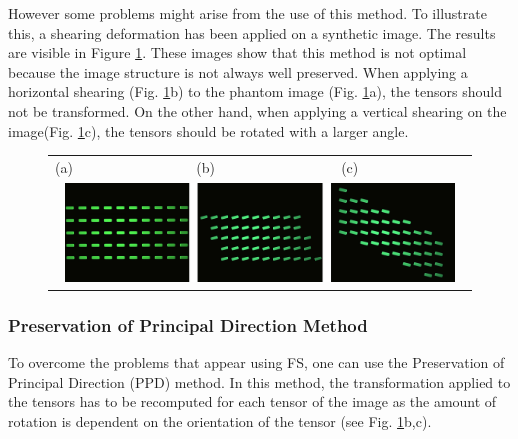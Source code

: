 \documentclass{InsightArticle}
\begin{document}
However some problems might arise from the use of this method. To illustrate this, a shearing deformation has been applied on a synthetic image. The results are visible in  Figure \ref{fig:FSTransformation}. These images show that this method is not optimal because the image structure is not always well preserved. When applying a horizontal shearing (Fig. \ref{fig:FSTransformation}b) to the phantom image (Fig. \ref{fig:FSTransformation}a), the tensors should not be transformed. On the other hand, when applying a vertical shearing on the image(Fig. \ref{fig:FSTransformation}c), the tensors should be rotated with a larger angle.


\begin{figure}
\begin{tabularx}{\textwidth}{CCC}
(a) & (b) & (c) \\
\\
\end{tabularx}
\label{fig:FSTransformation}
\end{figure}


\subsubsection{Preservation of Principal Direction Method}
To overcome the problems that appear using FS, one can use the Preservation of Principal Direction (PPD) method. In this method, the transformation applied to the tensors has to be recomputed for each tensor of the image as the amount of rotation is dependent on the orientation of the tensor (see Fig. \ref{fig:FSTransformation}b,c).
\end{document}
